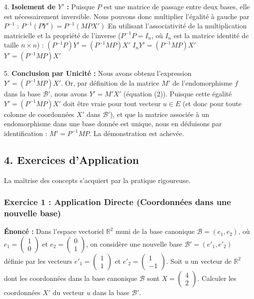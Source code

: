 \documentclass{report}
\begin{document}
4.  \textbf{Isolement de $Y'$ :}
    Puisque $P$ est une matrice de passage entre deux bases, elle est nécessairement inversible. Nous pouvons donc multiplier l'égalité à gauche par $P^{-1}$ :
    $P^{-1} (P Y') = P^{-1} (M P X')$
    En utilisant l'associativité de la multiplication matricielle et la propriété de l'inverse ($P^{-1} P = I_n$, où $I_n$ est la matrice identité de taille $n \times n$) :
    $(P^{-1} P) Y' = (P^{-1} M P) X'$
    $I_n Y' = (P^{-1} M P) X'$
    $Y' = (P^{-1} M P) X'$

5.  \textbf{Conclusion par Unicité :}
    Nous avons obtenu l'expression $Y' = (P^{-1} M P) X'$.
    Or, par définition de la matrice $M'$ de l'endomorphisme $f$ dans la base $\mathcal{B}'$, nous avons $Y' = M' X'$ (équation (2)).
    Puisque cette égalité $Y' = (P^{-1} M P) X'$ doit être vraie pour tout vecteur $u \in E$ (et donc pour toute colonne de coordonnées $X'$ dans $\mathcal{B}'$), et que la matrice associée à un endomorphisme dans une base donnée est unique, nous en déduisons par identification :
    $M' = P^{-1} M P$.
    La démonstration est achevée.

\subsection*{4. Exercices d'Application}

La maîtrise des concepts s'acquiert par la pratique rigoureuse.

\subsubsection*{Exercice 1 : Application Directe (Coordonnées dans une nouvelle base)}

\textbf{Énoncé :}
Dans l'espace vectoriel $\mathbb{R}^2$ muni de la base canonique $\mathcal{B} = (e_1, e_2)$, où $e_1 = \begin{pmatrix} 1 \\ 0 \end{pmatrix}$ et $e_2 = \begin{pmatrix} 0 \\ 1 \end{pmatrix}$, on considère une nouvelle base $\mathcal{B}' = (e'_1, e'_2)$ définie par les vecteurs $e'_1 = \begin{pmatrix} 1 \\ 1 \end{pmatrix}$ et $e'_2 = \begin{pmatrix} 1 \\ -1 \end{pmatrix}$.
Soit $u$ un vecteur de $\mathbb{R}^2$ dont les coordonnées dans la base canonique $\mathcal{B}$ sont $X = \begin{pmatrix} 4 \\ 2 \end{pmatrix}$.
Calculer les coordonnées $X'$ du vecteur $u$ dans la base $\mathcal{B}'$.
\end{document}
